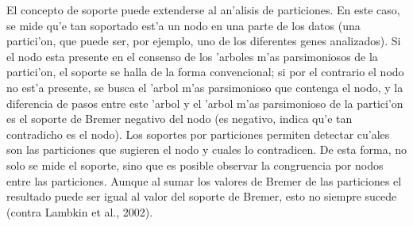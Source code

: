 El concepto de soporte puede extenderse al an'alisis de particiones. En este caso, se mide qu'e tan soportado est'a un nodo en una parte de los datos (una partici'on, que puede ser, por ejemplo, uno de los diferentes genes analizados). Si el nodo esta presente en el consenso de los 'arboles m'as parsimoniosos de la partici'on, el soporte se halla de la forma convencional; si por el contrario el nodo no est'a presente, se busca el 'arbol m'as parsimonioso que contenga el nodo, y la diferencia de pasos entre este 'arbol y el 'arbol m'as parsimonioso de la partici'on es el soporte de Bremer negativo del nodo (es negativo, indica qu'e tan contradicho es el nodo). Los soportes por particiones permiten detectar cu'ales son las particiones que sugieren el nodo y cuales lo contradicen. De esta forma, no solo se mide el soporte, sino que es posible observar la congruencia por nodos entre las particiones. Aunque al sumar los valores de Bremer de las particiones el resultado puede ser igual al valor del soporte de Bremer, esto no siempre sucede (contra Lambkin et al., 2002).
